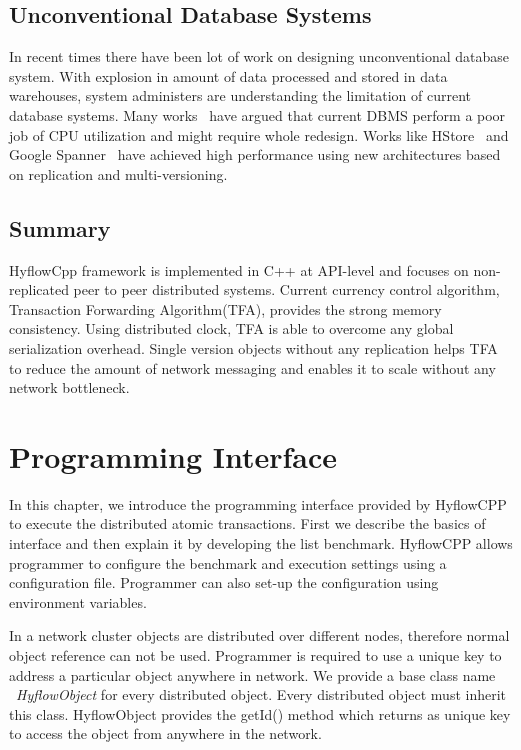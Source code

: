 \documentclass[12pt,english]{report}
\begin{document}
\section{Unconventional Database Systems}
In recent times there have been lot of work on designing unconventional database system. With explosion in amount of data processed and stored in data warehouses, system administers are understanding the limitation of current database systems. Many works~\cite{Stonebraker:2007:EAE:1325851.1325981, harizopoulos2008oltp} have argued that current DBMS perform a poor job of CPU utilization and might require whole redesign. Works like HStore~\cite{HSTORE:kallman2008h} and Google Spanner~\cite{corbett2012spanner} have achieved high performance using new architectures based on replication and multi-versioning. 

\section{Summary}
HyflowCpp framework is implemented in C++ at API-level and focuses on non-replicated peer to peer distributed systems. Current currency control algorithm, Transaction Forwarding Algorithm(TFA), provides the strong memory consistency. Using distributed clock, TFA is able to overcome any global serialization overhead. Single version objects without any replication helps TFA to reduce the amount of network messaging and enables it to scale without any network bottleneck.

\chapter{Programming Interface}\label{chap:progInterface}

In this chapter, we introduce the programming interface provided by HyflowCPP to execute the distributed atomic transactions. First we describe the basics of interface and then explain it by developing the list benchmark. HyflowCPP allows programmer to configure the benchmark and execution settings using a configuration file. Programmer can also set-up the configuration using environment variables.

In a network cluster objects are distributed over different nodes, therefore normal object reference can not be used. Programmer is required to use a unique key to address a particular object anywhere in network. We provide a base class name ~\emph{HyflowObject} for every distributed object. Every distributed object must inherit this class. HyflowObject provides the getId() method which returns as unique key to access the object from anywhere in the network.
\end{document}
